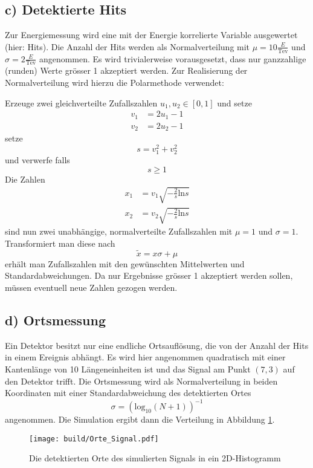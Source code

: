 \subsection*{c) Detektierte Hits}
Zur Energiemessung wird eine mit der Energie korrelierte Variable ausgewertet (hier: Hits). Die Anzahl der Hits werden als Normalverteilung mit $\mu=10\frac{E}{\text{Tev}}$ und $\sigma=2\frac{E}{\text{Tev}}$ angenommen.
Es wird trivialerweise vorausgesetzt, dass nur ganzzahlige (runden) Werte grösser 1 akzeptiert werden.
Zur Realisierung der Normalverteilung wird hierzu die Polarmethode verwendet:

Erzeuge zwei gleichverteilte Zufallszahlen $u_1,u_2\in[0,1]$ und setze
\begin{align}
    v_1&=2u_1-1\\
    v_2&=2u_2-1
\end{align}
setze
\begin{equation}
    s=v_1^2+v_2^2
\end{equation}
und verwerfe falls
\begin{equation}
    s\geq 1
\end{equation}
Die Zahlen
\begin{align}
    x_1&=v_1\sqrt{-\frac{2}{s}\text{ln}s}\\
    x_2&=v_2\sqrt{-\frac{2}{s}\text{ln}s}
\end{align}
sind nun zwei unabhängige, normalverteilte Zufallszahlen mit $\mu=1$ und $\sigma=1$.
Transformiert man diese nach
\begin{equation}
    \tilde{x}=x\sigma + \mu
\end{equation}
erhält man Zufallszahlen mit den gewünschten Mittelwerten und Standardabweichungen.
Da nur Ergebnisse grösser 1 akzeptiert werden sollen, müssen eventuell neue Zahlen gezogen werden.
\subsection*{d) Ortsmessung}
Ein Detektor besitzt nur eine endliche Ortsauflösung, die von der Anzahl der Hits in einem Ereignis abhängt.
Es wird hier angenommen quadratisch mit einer Kantenlänge von 10 Längeneinheiten ist und das Signal am Punkt $(7,3)$ auf den Detektor trifft.
Die Ortsmessung wird als Normalverteilung in beiden Koordinaten mit einer Standardabweichung des detektierten Ortes
\begin{equation}
    \sigma=\left(\text{log}_{10}(N+1)\right)^{-1}
\end{equation}
angenommen. Die Simulation ergibt dann die Verteilung in Abbildung \ref{fig:Orte_Signal}.
\begin{figure}
    \centering
    \texttt{[image: build/Orte\_Signal.pdf]}
    \caption{Die detektierten Orte des simulierten Signals in ein 2D-Histogramm}
    \label{fig:Orte_Signal}
\end{figure}

